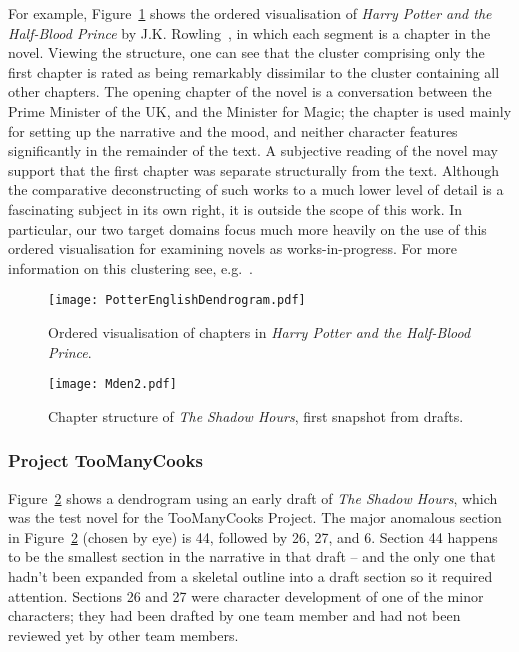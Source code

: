\documentclass{article}
\begin{document}
For example, Figure~\ref{PotterDen} shows the ordered visualisation of {\em Harry Potter and the Half-Blood Prince} by J.K. Rowling~\cite{halfblood}, in which each segment is a chapter in the novel. Viewing the structure, one can see that  the cluster comprising only the first chapter is rated as being remarkably dissimilar to the cluster containing all other chapters.  The opening chapter of the novel is a conversation between the Prime Minister of the UK, and the Minister for Magic; the chapter is used mainly for setting up the narrative and the mood, and neither character features significantly in the remainder of the text.  A subjective reading of the novel may support that the first chapter was separate structurally from the text.  Although the comparative deconstructing of such works to a much lower level of detail is a fascinating subject in its own right, it is outside the scope of this work.   In particular, our two target domains focus much more heavily on the use of this ordered visualisation for examining novels as works-in-progress. For more information on this clustering see, e.g.~\cite{murtagh1985multidimensional,murtagh2005correspondence}.



\begin{figure}[h]
\texttt{[image: PotterEnglishDendrogram.pdf]}
\caption{Ordered visualisation of chapters in {\em Harry Potter and the 
Half-Blood Prince}.}
\label{PotterDen}
\end{figure}

\begin{figure}[h]
\texttt{[image: Mden2.pdf]}
\caption{Chapter structure of  {\em The Shadow Hours}, first snapshot 
from drafts.}
\label{mden2}
\end{figure}

\subsubsection{Project TooManyCooks}

Figure~\ref{mden2} shows a dendrogram using an early draft of {\em The Shadow Hours}, which was the test novel for the TooManyCooks Project.  The major anomalous section in Figure~\ref{mden2} (chosen by eye) is 44, followed by  26, 27, and 6.   Section 44 happens to be the smallest section in the narrative in that draft -- and the only one that hadn't been expanded from a skeletal outline  into a draft section so it required attention.  Sections 26 and 27 were character development of one of the minor characters; they had been drafted by one team member and had not been reviewed yet by other team members.
\end{document}
